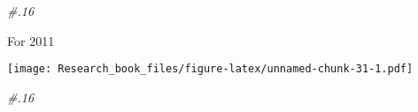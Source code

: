 \documentclass[]{book}
\newenvironment{Shaded}{\begin{snugshade}}{\end{snugshade}}
\newcommand{\KeywordTok}[1]{\textcolor[rgb]{0.13,0.29,0.53}{\textbf{#1}}}
\newcommand{\DataTypeTok}[1]{\textcolor[rgb]{0.13,0.29,0.53}{#1}}
\newcommand{\DecValTok}[1]{\textcolor[rgb]{0.00,0.00,0.81}{#1}}
\newcommand{\StringTok}[1]{\textcolor[rgb]{0.31,0.60,0.02}{#1}}
\newcommand{\CommentTok}[1]{\textcolor[rgb]{0.56,0.35,0.01}{\textit{#1}}}
\newcommand{\OperatorTok}[1]{\textcolor[rgb]{0.81,0.36,0.00}{\textbf{#1}}}
\newcommand{\NormalTok}[1]{#1}
\theoremstyle{definition}
\theoremstyle{definition}
\theoremstyle{definition}
\theoremstyle{remark}
\begin{document}
\begin{Shaded}
\begin{Highlighting}[]
\CommentTok{#.16}
\end{Highlighting}
\end{Shaded}

For 2011

\begin{Shaded}
\end{Shaded}

\texttt{[image: Research\_book\_files/figure-latex/unnamed-chunk-31-1.pdf]}

\begin{Shaded}
\begin{Highlighting}[]
\CommentTok{#.16}
\end{Highlighting}
\end{Shaded}
\end{document}
